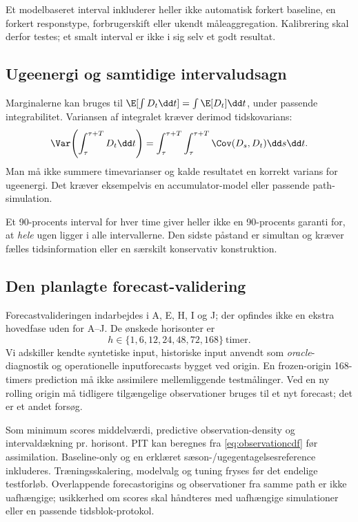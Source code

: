 Et modelbaseret interval inkluderer heller ikke automatisk forkert baseline, en forkert responstype, forbrugerskift eller ukendt måleaggregation. Kalibrering skal derfor testes; et smalt interval er ikke i sig selv et godt resultat.

\subsection{Ugeenergi og samtidige intervaludsagn}
Marginalerne kan bruges til \(\E[\int D_t\dd t]=\int\E[D_t]\dd t\), under passende integrabilitet. Variansen af integralet kræver derimod tidskovarians:
\begin{equation}
 \Var\!\left(\int_\tau^{\tau+T}D_t\dd t\right)
 =\int_\tau^{\tau+T}\int_\tau^{\tau+T}\Cov(D_s,D_t)\dd s\dd t.
 \label{eq:energyvariance}
\end{equation}
Man må ikke summere timevarianser og kalde resultatet en korrekt varians for ugeenergi. Det kræver eksempelvis en accumulator-model eller passende path-simulation.

Et 90-procents interval for hver time giver heller ikke en 90-procents garanti for, at \emph{hele} ugen ligger i alle intervallerne. Den sidste påstand er simultan og kræver fælles tidsinformation eller en særskilt konservativ konstruktion.

\subsection{Den planlagte forecast-validering}
Forecastvalideringen indarbejdes i A, E, H, I og J; der opfindes ikke en ekstra hovedfase uden for A--J. De ønskede horisonter er
\begin{equation}
 h\in\{1,6,12,24,48,72,168\}\ \text{timer}.
 \label{eq:horizons}
\end{equation}
Vi adskiller kendte syntetiske input, historiske input anvendt som \emph{oracle}-diagnostik og operationelle inputforecasts bygget ved origin. En frozen-origin 168-timers prediction må ikke assimilere mellemliggende testmålinger. Ved en ny rolling origin må tidligere tilgængelige observationer bruges til et nyt forecast; det er et andet forsøg.

Som minimum scores middelværdi, predictive observation-density og intervaldækning pr. horisont. PIT kan beregnes fra \eqref{eq:observationcdf} før assimilation. Baseline-only og en erklæret sæson-/ugegentagelsesreference inkluderes. Træningsskalering, modelvalg og tuning fryses før det endelige testforløb. Overlappende forecastorigins og observationer fra samme path er ikke uafhængige; usikkerhed om scores skal håndteres med uafhængige simulationer eller en passende tidsblok-protokol.

